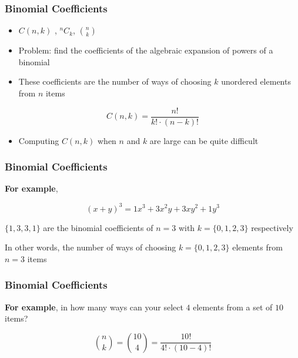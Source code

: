 \documentclass{beamer}
\begin{document}
\begin{frame}[fragile]
\frametitle{Binomial Coefficients}
\begin{itemize}
    \item $C(n,k)$ , $^nC_k$, $\binom{n}{k}$
    \item Problem: find the coefficients of the algebraic expansion of powers of a binomial
    \item These coefficients are the number of ways of choosing $k$ unordered elements from $n$ items
\end{itemize}

\begin{equation}\label{binom_coeff}
	C(n,k) = \frac{n!}{k!\cdot (n-k)!}
\end{equation}

\begin{itemize}
    \item Computing $C(n,k)$ when $n$ and $k$ are large can be quite difficult
\end{itemize}

\end{frame}


\begin{frame}[fragile]
\frametitle{Binomial Coefficients}

\textbf{For example}, 

\begin{equation*}
    (x+y)^3= 1x^3 + 3x^2y  + 3xy^2 + 1y^3
\end{equation*}

\vspace{0.3cm}

$\{1,3,3,1\}$ are the binomial coefficients of $n=3$ with $k=\{0,1,2,3\}$ respectively

\vspace{0.3cm}
In other words, the number of ways of choosing $k = \{0, 1, 2, 3\}$ elements from $n=3$ items

\end{frame}

\begin{frame}[fragile]
\frametitle{Binomial Coefficients}

\textbf{For example}, in how many ways can your select $4$ elements from a set of $10$ items?

\begin{equation*}
    \binom{n}{k} = \binom{10}{4} = \frac{10!}{4!\cdot(10-4)!}
\end{equation*}

\end{frame}
\end{document}
